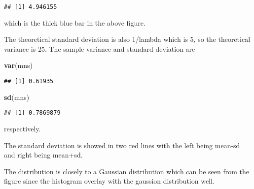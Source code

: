 \documentclass[
]{article}
\newenvironment{Shaded}{\begin{snugshade}}{\end{snugshade}}
\newcommand{\KeywordTok}[1]{\textcolor[rgb]{0.13,0.29,0.53}{\textbf{#1}}}
\newcommand{\NormalTok}[1]{#1}
\begin{document}
\begin{verbatim}
## [1] 4.946155
\end{verbatim}

which is the thick blue bar in the above figure.

The theoretical standard deviation is also 1/lambda which is 5, so the
theoretical variance is 25. The sample variance and standard deviation
are

\begin{Shaded}
\begin{Highlighting}[]
  \KeywordTok{var}\NormalTok{(mns)}
\end{Highlighting}
\end{Shaded}

\begin{verbatim}
## [1] 0.61935
\end{verbatim}

\begin{Shaded}
\begin{Highlighting}[]
  \KeywordTok{sd}\NormalTok{(mns)}
\end{Highlighting}
\end{Shaded}

\begin{verbatim}
## [1] 0.7869879
\end{verbatim}

respectively.

The standard deviation is showed in two red lines with the left being
mean-sd and right being mean+sd.

The distribution is closely to a Gaussian distribution which can be seen
from the figure since the histogram overlay with the gaussion
distribution well.
\end{document}
